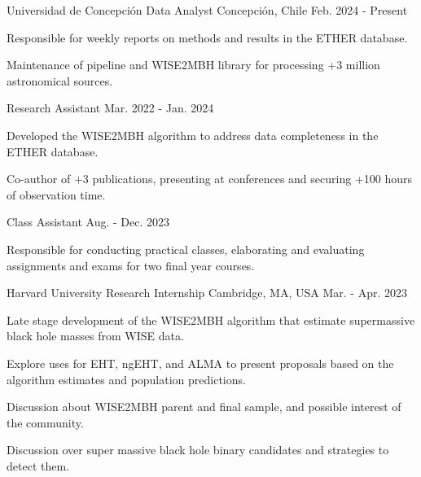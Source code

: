 
\begin{cventries}

\cventry
    {Universidad de Concepción}
    {Data Analyst}
    {Concepción, Chile}
    {Feb. 2024 - Present}
    {
      \begin{cvitems}
        \item{Responsible for weekly reports on methods and results in the ETHER database.}
        \item{Maintenance of pipeline and WISE2MBH library for processing +3 million astronomical sources.}
      \end{cvitems}
      \vspace{1em}
    }

  \cventryprevrole
    {Research Assistant}
    {Mar. 2022 - Jan. 2024}
    {
      \begin{cvitems}
        \item{Developed the WISE2MBH algorithm to address data completeness in the ETHER database.}
        \item{Co-author of +3 publications, presenting at conferences and securing +100 hours of observation time.}
      \end{cvitems}
      \vspace{1em}
    }

  \cventryprevrole
    {Class Assistant}
    {Aug. - Dec. 2023}
    {
      \begin{cvitems}
        \item{Responsible for conducting practical classes, elaborating and evaluating assignments and exams for two final year courses.}
      \end{cvitems}
      \vspace{1em}
    }

  \cventry
    {Harvard University}
    {Research Internship}
    {Cambridge, MA, USA}
    {Mar. - Apr. 2023}
    {
      \begin{cvitems}
        \item{Late stage development of the WISE2MBH algorithm that estimate supermassive black hole masses from WISE data.}
        \item{Explore uses for EHT, ngEHT, and ALMA to present proposals based on the algorithm estimates and population predictions.}
        \item {Discussion about WISE2MBH parent and final sample, and possible interest of the community.}
        \item{Discussion over super massive black hole binary candidates and strategies to detect them.}
      \end{cvitems}
      \vspace{1em}
    }


\end{cventries}
